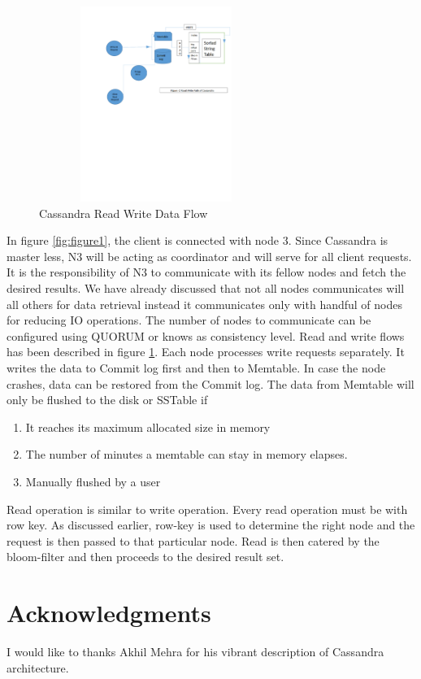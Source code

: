 \documentclass[9pt,twocolumn,twoside]{../../styles/osajnl}
\begin{document}
\begin{figure}[h]
\begin{center}
\includegraphics[width =3in,height=2.5in]{images/Cassandra_Write_Read_figure2}
\caption{Cassandra Read Write Data Flow}
\label{fig:figure2}
\end{center}
\end{figure}

In figure \ref{fig:figure1}, the client is connected with node 3. Since Cassandra is master less, N3 will be acting as coordinator and will serve for all client requests. It is the responsibility of N3 to communicate with its fellow nodes and fetch the desired results. We have already discussed that not all nodes communicates will all others for data retrieval instead it communicates only with handful of nodes for reducing IO operations. The number of nodes to communicate can be configured using QUORUM or knows as consistency level.
Read and write flows has been described in figure \ref{fig:figure2}. Each node processes write requests separately. It writes the data to Commit log first and then to Memtable. In case the node crashes, data can be restored from the Commit log. The data from Memtable will only be flushed to the disk or SSTable if 
\begin{enumerate}
     \item It reaches its maximum allocated size in memory
     \item The number of minutes a memtable can stay in memory elapses.   
     \item Manually flushed by a user  
\end{enumerate}
Read operation is similar to write operation. Every read operation must be with row key. As discussed earlier, row-key is used to determine the right node and the request is then passed to that particular node. Read is then catered by the bloom-filter and then proceeds to the desired result set.

\section*{Acknowledgments}

I would like to thanks Akhil Mehra for his vibrant description of Cassandra architecture.



\end{document}
